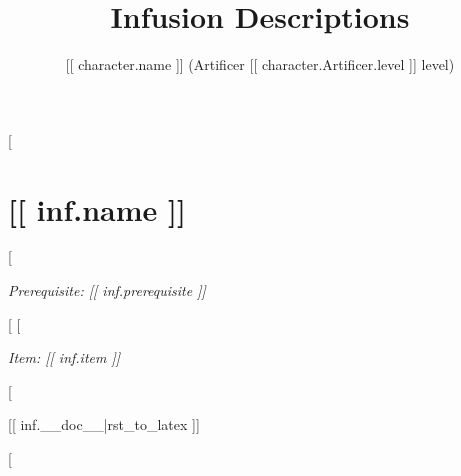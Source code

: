 \documentclass[10pt,twocolumn,lettersize]{article}
\title{Infusion Descriptions}
\author{[[ character.name ]] (Artificer [[ character.Artificer.level ]] level)}
\date{}
\begin{document}
\maketitle

[%

  \section*{[[ inf.name ]]}

  [%

		\noindent
    \textit{Prerequisite: [[ inf.prerequisite ]]}%

  [%
  [%

    \noindent
    \textit{Item: [[ inf.item ]]}%

  [%

  [[ inf.__doc__|rst_to_latex ]]

[%
\end{document}
